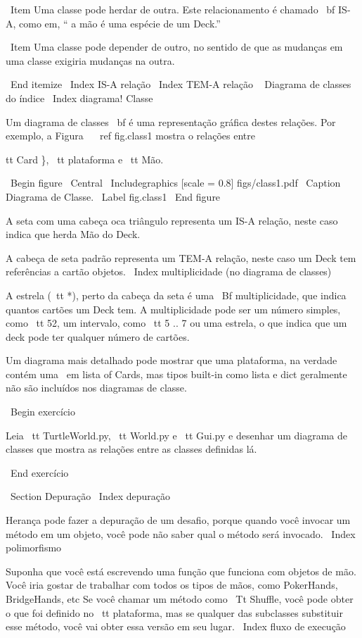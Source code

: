 \documentclass[10pt]{book}
\begin{document}
{{{{{{{{{{{{{{{{\ Item Uma classe pode herdar de outra. Este relacionamento
é chamado {\ bf IS-A}, como em, `` a mão é uma espécie de um Deck.''

\ Item Uma classe pode depender de outro, no sentido de que as mudanças
em uma classe exigiria mudanças na outra.

\ End {itemize}
\ Index {IS-A relação}
\ Index {TEM-A relação}
\ {} Diagrama de classes do índice
\ Index {diagrama! Classe}

Um diagrama de classes {\ bf} é uma representação gráfica destes
relações. Por exemplo, a Figura ~ \ ref {fig.class1} mostra o
relações entre {tt Card \}, {\ tt plataforma} e {\ tt Mão}.

\ Begin {figure}
\ Central
{\ Includegraphics [scale = 0.8] {figs/class1.pdf}}
\ Caption {Diagrama de Classe.}
\ Label {} fig.class1
\ End {figure}


A seta com uma cabeça oca triângulo representa um IS-A
relação, neste caso indica que herda Mão
do Deck.

A cabeça de seta padrão representa um TEM-A
relação, neste caso um Deck tem referências a cartão
objetos.
\ Index {multiplicidade (no diagrama de classes)}

A estrela ({\ tt *}), perto da cabeça da seta é uma 
{\ Bf multiplicidade}, que indica quantos cartões um Deck tem.
A multiplicidade pode ser um número simples, como {\ tt 52}, um intervalo,
como {\ tt 5 .. 7} ou uma estrela, o que indica que um deck pode
ter qualquer número de cartões.

Um diagrama mais detalhado pode mostrar que uma plataforma, na verdade
contém uma {\ em lista} of Cards, mas tipos built-in
como lista e dict geralmente não são incluídos nos diagramas de classe.

\ Begin {} exercício

Leia {\ tt TurtleWorld.py}, {\ tt World.py} e {\ tt Gui.py}
e desenhar um diagrama de classes que mostra as relações entre
as classes definidas lá.

\ End {} exercício


\ Section {} Depuração
\ Index {depuração}

Herança pode fazer a depuração de um desafio, porque quando você
invocar um método em um objeto, você pode não saber qual o método
será invocado.
\ Index {polimorfismo}

Suponha que você está escrevendo uma função que funciona com objetos de mão.
Você iria gostar de trabalhar com todos os tipos de mãos, como
PokerHands, BridgeHands, etc Se você chamar um método como
{\ Tt Shuffle}, você pode obter o que foi definido no {\ tt plataforma},
mas se qualquer das subclasses substituir esse método, você vai
obter essa versão em seu lugar.  
\ Index {fluxo de execução}

}}}}}}}}}}}}}}}}}
\end{document}

